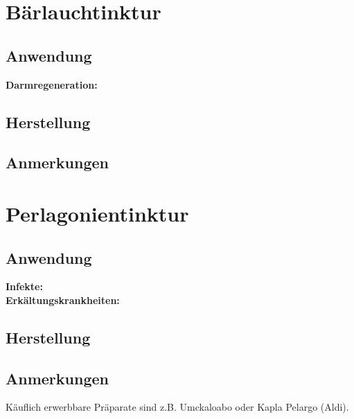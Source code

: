 \newpage



\section{Bärlauchtinktur}



\subsection{Anwendung}
\textbf{Darmregeneration:} \\ 

\subsection{Herstellung}
\subsection{Anmerkungen}



\newpage



\section{Perlagonientinktur}


 

\subsection{Anwendung}
\textbf{Infekte:} \\ 

\textbf{Erkältungskrankheiten:} \\ 


\subsection{Herstellung}
\subsection{Anmerkungen}

Käuflich erwerbbare Präparate sind z.B. Umckaloabo oder Kapla Pelargo (Aldi).








